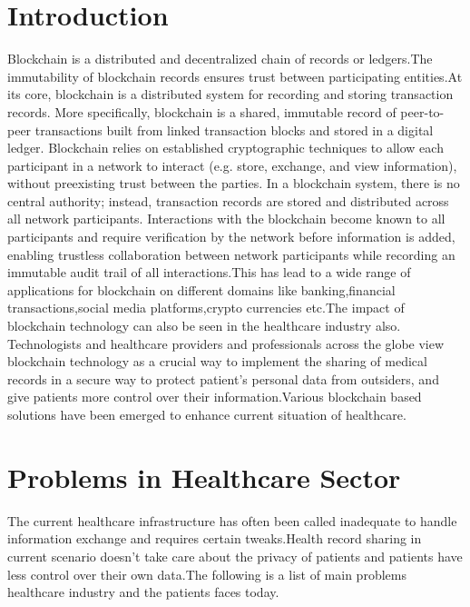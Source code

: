 \documentclass[12pt]{report}
\begin{document}
\listoffigures


\chapter{Introduction}

Blockchain is a distributed and decentralized chain of records or ledgers.The immutability of blockchain records ensures trust between participating entities.At its core, blockchain is a distributed
system for recording and storing transaction
records. More specifically, blockchain is a
shared, immutable record of peer-to-peer
transactions built from linked transaction
blocks and stored in a digital ledger.
Blockchain relies on established
cryptographic techniques to allow each
participant in a network to interact (e.g.
store, exchange, and view information),
without preexisting trust between the
parties. In a blockchain system, there is no
central authority; instead, transaction
records are stored and distributed across all
network participants. Interactions with the
blockchain become known to all participants
and require verification by the network
before information is added, enabling
trustless collaboration between network
participants while recording an immutable
audit trail of all interactions.This has lead to a wide range of applications for blockchain on different domains like banking,financial transactions,social media platforms,crypto currencies etc.The impact of blockchain technology can also be seen in the healthcare industry also. Technologists and healthcare providers and professionals across the globe view blockchain technology as a crucial way to implement the sharing of medical records in a secure way to protect patient's personal data from outsiders, and give patients more control over their information.Various blockchain based solutions have been emerged to enhance current situation of healthcare.

\chapter{Problems in Healthcare Sector}

The current healthcare infrastructure has often been called inadequate to handle information exchange and requires certain tweaks.Health record sharing in current scenario doesn't take care about the privacy of patients and patients have less control over their own data.The following is a list of main problems healthcare industry and the patients faces today.
\end{document}
